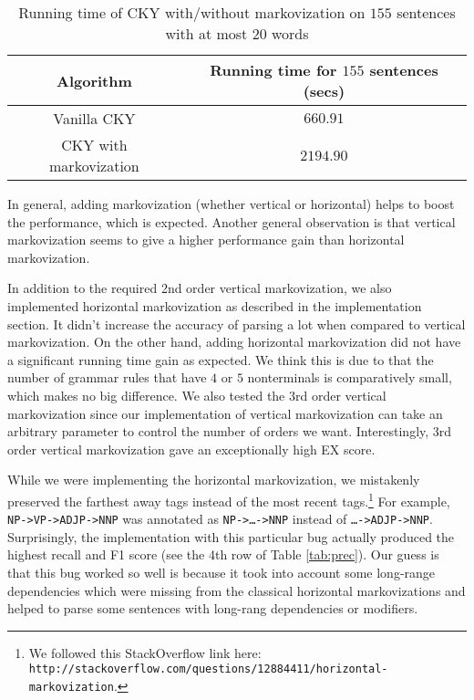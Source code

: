 \documentclass[letterpaper]{article}
\begin{document}
\begin{table}
\begin{center}
\begin{tabular}{|c|c|}
\hline
Algorithm & Running time for $155$ sentences (secs) \\
\hline
Vanilla CKY & $660.91$ \\
\hline
CKY with markovization & $2194.90$ \\
\hline
\end{tabular}
\caption{Running time of CKY with/without markovization on $155$ sentences with at most $20$ words}\label{tab:time}
\end{center}
\end{table}
In general, adding markovization (whether vertical or horizontal) helps to boost the performance, which is expected. Another general observation is that vertical markovization seems to give a higher performance gain than horizontal markovization.

In addition to the required 2nd order vertical markovization, we also implemented horizontal markovization as described in the implementation section. It didn't increase the accuracy of parsing a lot when compared to  vertical markovization. On the other hand, adding horizontal markovization did not have a significant running time gain as expected. We think this is due to that the number of grammar rules that have $4$ or $5$ nonterminals is comparatively small, which makes no big difference. 
We also tested the 3rd order vertical markovization since our implementation of vertical markovization can take an arbitrary parameter to control the number of orders we want.
Interestingly, 3rd order vertical markovization gave an exceptionally high EX score.

\vspace{0.25cm}

While we were implementing the horizontal markovization, we mistakenly preserved the farthest away tags instead of the most recent tags.\footnote{We followed this StackOverflow link here:  \texttt{http://stackoverflow.com/questions/12884411/horizontal-markovization}.}
For example, \texttt{NP->VP->ADJP->NNP} was annotated as \texttt{NP->\dots->NNP}  instead of \texttt{\dots->ADJP->NNP}. Surprisingly, the implementation with this particular bug actually produced the highest recall and F1 score (see the 4th row of Table \ref{tab:prec}).
Our guess is that this bug worked so well is because it took into account some long-range dependencies which were missing from the classical horizontal markovizations and helped to parse some sentences with long-rang dependencies or modifiers.
\end{document}
